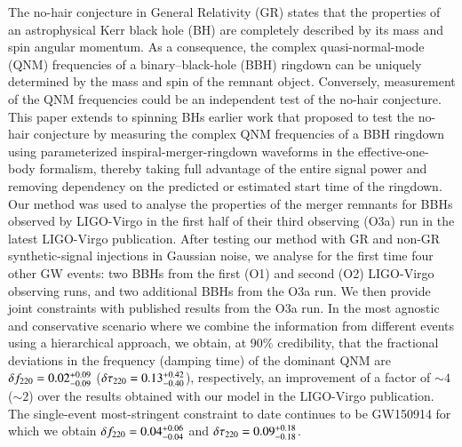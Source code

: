   The no-hair conjecture in General Relativity (GR) states that the
  properties of an astrophysical Kerr black hole (BH) are completely described by its
  mass and spin angular momentum. As a consequence, the complex
  quasi-normal-mode (QNM) frequencies of a binary--black-hole (BBH)
  ringdown can be uniquely determined by the mass and spin of the
  remnant object. Conversely, measurement of the QNM frequencies could
  be an independent test of the no-hair conjecture. This paper extends to spinning BHs earlier work that proposed to
  test the no-hair conjecture by measuring the complex QNM
  frequencies of a BBH ringdown using parameterized inspiral-merger-ringdown waveforms in the effective-one-body formalism, 
thereby taking full advantage of the entire signal power and removing dependency on the
  predicted or estimated start time of the ringdown. Our method was used to analyse the
  properties of the merger remnants for BBHs observed by
  LIGO-Virgo in the first half of their third observing (O3a) run in
  the latest LIGO-Virgo publication. After testing our method with GR and non-GR synthetic-signal injections in Gaussian noise, 
we analyse for the first time four other GW events: two BBHs from the first (O1) and second (O2) LIGO-Virgo 
  observing runs, and two additional BBHs from the O3a run. We then provide joint constraints with published results
  from the O3a run. In the most agnostic and conservative scenario where we combine the information from different
events using a hierarchical approach, we obtain, at $90\%$ credibility, that 
the fractional deviations in the frequency (damping time) of the dominant QNM are 
$\delta f_{\text{220}}=0.02^{+0.09}_{-0.09}$ ($\delta \tau_{\text{220}}=0.13^{+0.42}_{-0.40}$), respectively, an improvement of a factor of $\sim 4$ ($\sim 2$) 
over the results obtained with our model in the LIGO-Virgo publication. The single-event most-stringent constraint to date continues to be 
GW150914 for which we obtain $\delta f_{\text{220}}=0.04^{+0.06}_{-0.04}$ and $\delta \tau_{\text{220}}=0.09^{+0.18}_{-0.18}$.